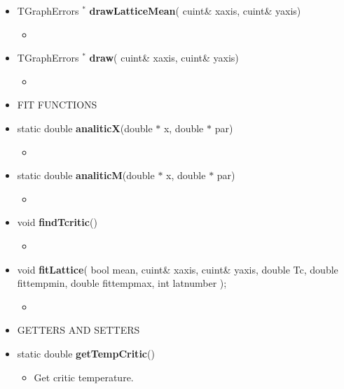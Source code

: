 \begin{itemize}
\begin{itemize}
  \item[] TGraphErrors ${}^*$ \textbf{drawLatticeMean}(
    cuint\& x\textunderscore axis,
    cuint\& y\textunderscore axis)
    \begin{itemize}
    \item[]
    \end{itemize}

  \item[] TGraphErrors ${}^*$ \textbf{draw}(
    cuint\& x\textunderscore axis,
    cuint\& y\textunderscore axis)
    \begin{itemize}
    \item[] 
    \end{itemize}


  \item[] FIT FUNCTIONS \\

  \item[] static double \textbf{analiticX}(double $*$ x, double $*$ par)
    \begin{itemize}
    \item[]
    \end{itemize}

  \item[] static double \textbf{analiticM}(double $*$ x, double $*$ par)
    \begin{itemize}
    \item[]
    \end{itemize}

  \item[] void \textbf{findTcritic}()
    \begin{itemize}
    \item[]
    \end{itemize}

  \item[] void \textbf{fitLattice}( bool mean,
    cuint\& x\textunderscore axis,
    cuint\& y\textunderscore axis,
    double Tc,
    double fit\textunderscore temp\textunderscore min,
    double fit\textunderscore temp\textunderscore max,
    int lat\textunderscore number
    );
    \begin{itemize}
    \item[]
    \end{itemize}

    \newpage

  \item[]       GETTERS AND SETTERS \\

  \item[] static double \textbf{getTempCritic}()
    \begin{itemize}
    \item[] Get critic temperature.
    \end{itemize}


\end{itemize}
\end{itemize}

